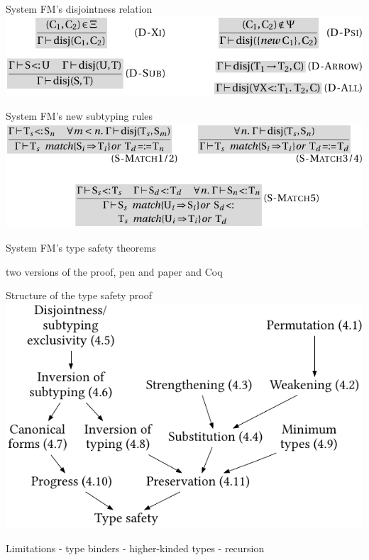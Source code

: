 \documentclass[10pt]{beamer}
\newenvironment{slide}[2][]
  {\begin{frame}[fragile,environment=slide,#1]{#2}}
  {\end{frame}}
\begin{document}
\begin{slide}{System FM's disjointness relation}
\includegraphics[width=\textwidth]{figures/FMDisjointness.pdf}
\end{slide}

\begin{slide}{System FM's new subtyping rules}
\includegraphics[width=\textwidth]{figures/FMSubtyping.pdf}
\end{slide}


\begin{slide}{System FM's type safety}
theorems

two versions of the proof, pen and paper and Coq
\end{slide}

\begin{slide}{Structure of the type safety proof}
\includegraphics[width=\textwidth]{figures/FMProofStructure.pdf}
\end{slide}

\begin{slide}{Limitations}
- type binders
- higher-kinded types
- recursion
\end{slide}
\end{document}
